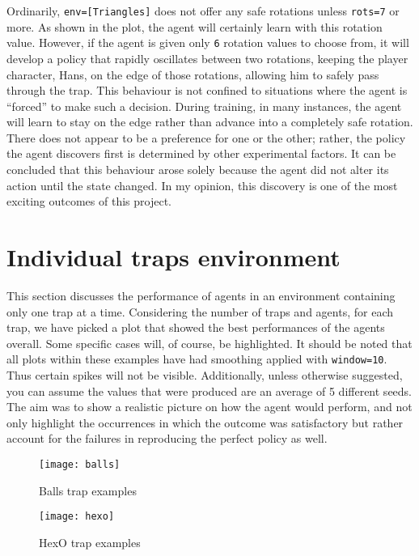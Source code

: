 Ordinarily, \texttt{env=[Triangles]} does not offer any safe rotations unless \texttt{rots=7} or more. As shown in the plot, the agent will certainly learn with this rotation value. However, if the agent is given only \texttt{6} rotation values to choose from, it will develop a policy that rapidly oscillates between two rotations, keeping the player character, Hans, on the edge of those rotations, allowing him to safely pass through the trap. This behaviour is not confined to situations where the agent is ``forced'' to make such a decision. During training, in many instances, the agent will learn to stay on the edge rather than advance into a completely safe rotation. There does not appear to be a preference for one or the other; rather, the policy the agent discovers first is determined by other experimental factors. It can be concluded that this behaviour arose solely because the agent did not alter its action until the state changed. In my opinion, this discovery is one of the most exciting outcomes of this project.

\section{Individual traps environment}
This section discusses the performance of agents in an environment containing only one trap at a time.  Considering the number of traps and agents, for each trap, we have picked a plot that showed the best performances of the agents overall. Some specific cases will, of course, be highlighted. It should be noted that all plots within these examples have had smoothing applied with \texttt{window=10}. Thus certain spikes will not be visible. Additionally, unless otherwise suggested, you can assume the values that were produced are an average of 5 different seeds. The aim was to show a realistic picture on how the agent would perform, and not only highlight the occurrences in which the outcome was satisfactory but rather account for the failures in reproducing the perfect policy as well.

\begin{figure}[h]
    \centering
    \texttt{[image: balls]}
    \caption{Balls trap examples}
    \label{fig:balls_eg}
\end{figure}

\begin{figure}[h]
    \centering
    \texttt{[image: hexo]}
    \caption{HexO trap examples}
    \label{fig:hexo_eg}
\end{figure}

